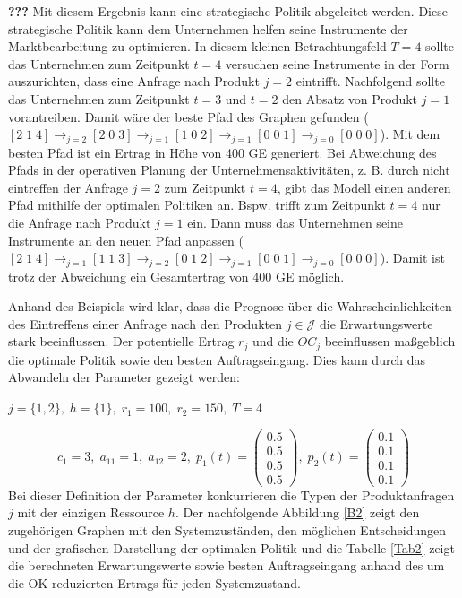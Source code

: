 \textbf{???} Mit diesem Ergebnis kann eine strategische Politik abgeleitet werden. Diese strategische Politik kann dem Unternehmen helfen seine Instrumente der Marktbearbeitung zu optimieren. In diesem kleinen Betrachtungsfeld $T=4$ sollte das Unternehmen zum Zeitpunkt $t=4$ versuchen seine Instrumente in der Form auszurichten, dass eine Anfrage nach Produkt $j=2$ eintrifft. Nachfolgend sollte das Unternehmen zum Zeitpunkt $t=3$ und $t=2$ den Absatz von Produkt $j=1$ vorantreiben. Damit wäre der beste Pfad des Graphen gefunden ($[2\;1\;4] \rightarrow_{j=2} [2\;0\;3] \rightarrow_{j=1} [1\;0\;2] \rightarrow_{j=1} [0\;0\;1]\rightarrow_{j=0} [0\;0\;0]$). Mit dem besten Pfad ist ein Ertrag in Höhe von 400 GE generiert. Bei Abweichung des Pfads in der operativen Planung der Unternehmensaktivitäten, z. B. durch nicht eintreffen der Anfrage $j=2$ zum Zeitpunkt $t=4$, gibt das Modell einen anderen Pfad mithilfe der optimalen Politiken an. Bspw. trifft zum Zeitpunkt $t=4$ nur die Anfrage nach Produkt $j=1$ ein. Dann muss das Unternehmen seine Instrumente an den neuen Pfad anpassen ($[2\;1\;4] \rightarrow_{j=1} [1\;1\;3] \rightarrow_{j=2} [0\;1\;2] \rightarrow_{j=1} [0\;0\;1]\rightarrow_{j=0} [0\;0\;0]$). Damit ist trotz der Abweichung ein Gesamtertrag von 400 GE möglich.

Anhand des Beispiels wird klar, dass die Prognose über die Wahrscheinlichkeiten des Eintreffens einer Anfrage nach den Produkten $j\in\mathcal{J}$ die Erwartungswerte stark beeinflussen. Der potentielle Ertrag $r_{j}$ und die $OC_{j}$ beeinflussen maßgeblich die optimale Politik sowie den besten Auftragseingang. Dies kann durch das Abwandeln der Parameter gezeigt werden:
\begin{center}
$j = \{1, 2\}, \; h = \{1\}, \; r_{1} = 100, \; r_{2} = 150, \; T=4$
\end{center}
\[
    c_{1}= 3, \;
    a_{11}=1, \;
     a_{12}=2, \;
     p_{1}(t)=\begin{pmatrix} 0.5\\ 0.5\\ 0.5\\ 0.5  \end{pmatrix}, \;
     p_{2}(t)=\begin{pmatrix} 0.1\\ 0.1\\ 0.1\\ 0.1  \end{pmatrix}
  \]
Bei dieser Definition der Parameter konkurrieren die Typen der Produktanfragen $j$ mit der einzigen Ressource $h$. Der nachfolgende Abbildung \ref{B2} zeigt den zugehörigen Graphen mit den Systemzuständen, den möglichen Entscheidungen und der grafischen Darstellung der optimalen Politik und die Tabelle \ref{Tab2} zeigt die berechneten Erwartungswerte sowie besten Auftragseingang anhand des um die OK reduzierten Ertrags für jeden Systemzustand.

